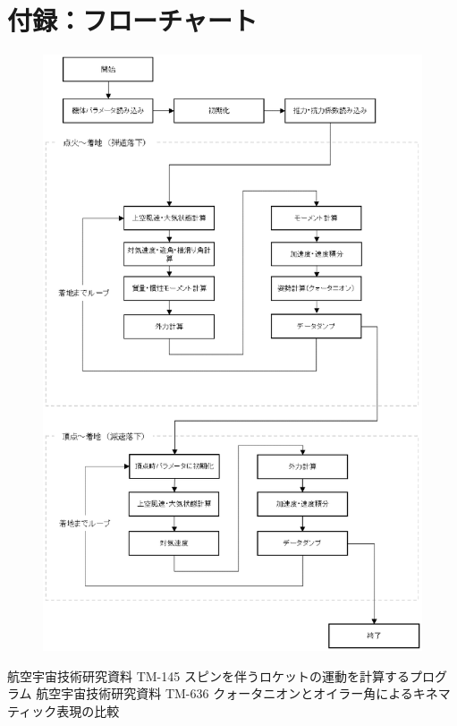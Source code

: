 \documentclass[a4paper]{jarticle}
\begin{document}
\section{付録：フローチャート}
\begin{figure}[H]
  \includegraphics[scale=0.8]{./flowchart.eps}
\end{figure}

\begin{thebibliography}{9}
   航空宇宙技術研究資料 TM-145 スピンを伴うロケットの運動を計算するプログラム
   航空宇宙技術研究資料 TM-636 クォータニオンとオイラー角によるキネマティック表現の比較
\end{thebibliography}
\end{document}
